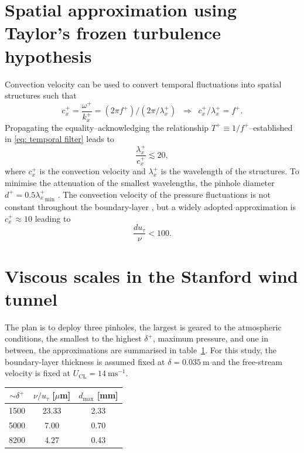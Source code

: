\documentclass[11pt,a4paper]{article}
\begin{document}
\section{Spatial approximation using Taylor's frozen turbulence hypothesis}

    Convection velocity can be used to convert temporal fluctuations into spatial structures such that
    \begin{equation}
        c_x^+ = \frac{\omega^+}{k_x^+} = (2\pi f^+) / (2\pi / \lambda_x^+) \;\;\Longrightarrow \;\; c_x^+ / \lambda_x^+ = f^+ .
    \end{equation}
    Propagating the equality--acknowledging the relationship $T^+\equiv1/f^+$--established in \eqref{eq: temporal filter} leads to
    \begin{equation}
        \frac{\lambda_x^+}{c_x^+} \lesssim 20,
    \end{equation}
    where $c_x^+$ is the convection velocity and $\lambda_x^+$ is the wavelength of the structures. To minimise the attenuation of the smallest wavelengths, the pinhole diameter $d^+ = 0.5 {\lambda_x^+}_{\min}$ \citep{corcos_structure_1964}. The convection velocity of the pressure fluctuations is not constant throughout the boundary-layer \citep{willmarth_measurements_1962}, but a widely adopted approximation is $c_x^+\approx 10$ leading to
    \begin{equation}
        \boxed{\frac{d u_\tau}{\nu} < 100.}
    \end{equation}

\section{Viscous scales in the Stanford wind tunnel}

    The plan is to deploy three pinholes, the largest is geared to the atmospheric conditions, the smallest to the highest $\delta^+$, maximum pressure, and one in between, the approximations are summarised in table~\ref{tab:stanford}.
    For this study, the boundary-layer thickness is assumed fixed at $\delta = 0.035~\mathrm{m}$ and the free-stream velocity is fixed at $U_{\mathrm{CL}} = 14~\mathrm{ms}^{-1}$.
    
    \begin{table}[H]
        \centering
        \begin{tabular}{c c c}
            $\sim \delta^+$ & $\nu/u_\tau$ [$\mu$m] & $d_{\max}$ [mm] \\
            \hline
            1500 & 23.33 & 2.33 \\
            5000 & 7.00 & 0.70 \\
            8200 & 4.27 & 0.43 \\
        \end{tabular}
    \label{tab:stanford}
    \end{table}
\end{document}
